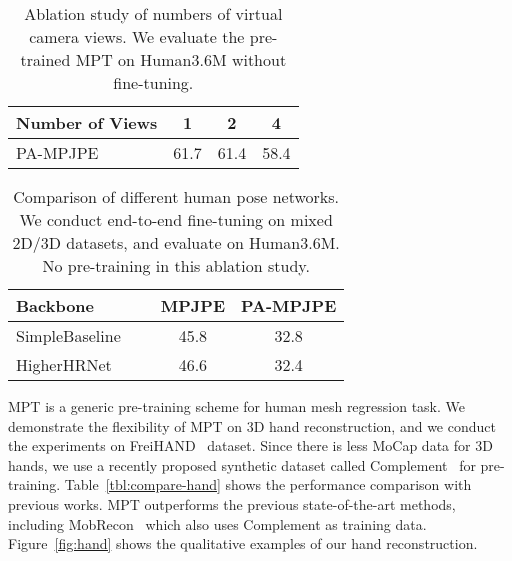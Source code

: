 \begin{table}
\centering
\begin{tabular}{lccc}
	\toprule[1.5pt]
	 Number of Views & 1 & 2 & 4\\
	 \midrule
	 PA-MPJPE  & 61.7 & 61.4 & 58.4 \\
	\bottomrule[1.5pt]
\end{tabular}
\caption{Ablation study of numbers of virtual camera views. We evaluate the pre-trained MPT on Human3.6M without fine-tuning.}
\vspace{-0mm}
\label{tbl:cam_views}
\end{table} \begin{table}[t]
\centering
\begin{tabular}{lccc}
    \toprule[1.5pt]
	Backbone & & MPJPE  & PA-MPJPE  \\
 	\midrule
	SimpleBaseline~\cite{xiao2018simple} &  & 45.8 & 32.8\\
	HigherHRNet~\cite{cheng2020higherhrnet} & & 46.6 & 32.4\\
	\bottomrule[1.5pt]
\end{tabular}
\caption{Comparison of different human pose networks. We conduct end-to-end fine-tuning on mixed 2D/3D datasets, and evaluate on Human3.6M. No pre-training in this ablation study. 
}
\label{tbl:backbones}
\vspace{-2mm}
\end{table} 
 MPT is a generic pre-training scheme for human mesh regression task. We demonstrate the flexibility of MPT on 3D hand reconstruction, and we conduct the experiments on FreiHAND~\cite{zimmermann2019freihand} dataset. Since there is less MoCap data for 3D hands, we use a recently proposed synthetic dataset called Complement~\cite{MobRecon} for pre-training. Table~\ref{tbl:compare-hand} shows the performance comparison with previous works. MPT outperforms the previous state-of-the-art methods, including MobRecon~\cite{MobRecon} which also uses Complement as training data. Figure~\ref{fig:hand} shows the qualitative examples of our hand reconstruction.


